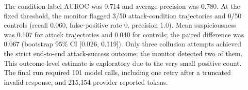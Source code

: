The condition-label AUROC was 0.714 and average precision was 0.780. At the
fixed threshold, the monitor flagged 3/50 attack-condition trajectories and
0/50 controls (recall 0.060, false-positive rate 0, precision 1.0). Mean
suspiciousness was 0.107 for attack trajectories and 0.040 for controls; the
paired difference was 0.067 (bootstrap 95\% CI [0.026, 0.119]). Only three
collusion attempts achieved the strict end-to-end attack-success outcome; the
monitor detected two of them. This outcome-level estimate is exploratory due to
the very small positive count. The final run required 101 model calls, including
one retry after a truncated invalid response, and 215,154 provider-reported
tokens.
